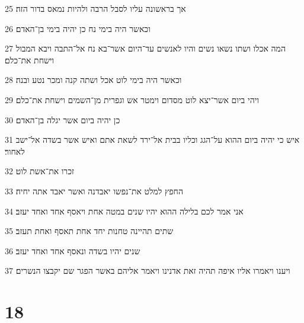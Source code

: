 \par 25 אך בראשונה עליו לסבל הרבה ולהיות נמאס בדור הזה׃
\par 26 וכאשר היה בימי נח כן יהיה בימי בן־האדם׃
\par 27 המה אכלו ושתו נשאו נשים והיו לאנשים עד־היום אשר־בא נח אל־התבה ויבא המבול וישחת את־כלם׃
\par 28 וכאשר היה בימי לוט אכל ושתה קנה ומכר נטע ובנה׃
\par 29 ויהי ביום אשר־יצא לוט מסדום וימטר אש וגפרית מן־השמים וישחת את־כלם׃
\par 30 כן יהיה ביום אשר יגלה בן־האדם׃
\par 31 איש כי יהיה ביום ההוא על־הגג וכליו בבית אל־ירד לשאת אתם ואיש אשר בשדה אל־ישב לאחור׃
\par 32 זכרו את־אשת לוט׃
\par 33 החפץ למלט את־נפשו יאבדנה ואשר יאבד אתה יחיה׃
\par 34 אני אמר לכם בלילה ההוא יהיו שנים במטה אחת ויאסף אחד ואחד יעזב׃
\par 35 שתים תהיינה טחנות יחד אחת תאסף ואחת תעזב׃
\par 36 שנים יהיו בשדה ונאסף אחד ואחד יעזב׃
\par 37 ויענו ויאמרו אליו איפה תהיה זאת אדנינו ויאמר אליהם באשר הפגר שם יקבצו הנשרים׃

\chapter{18}

